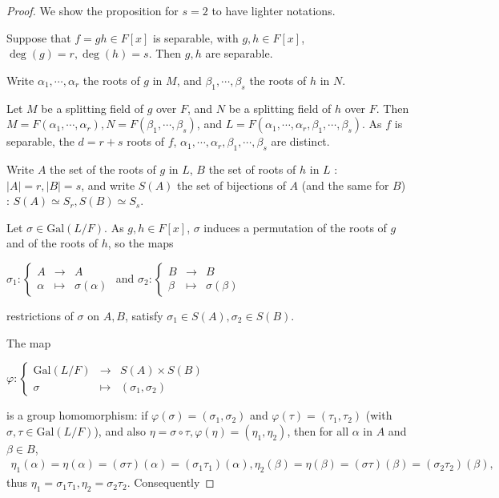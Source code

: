 \documentclass[11pt,a4paper]{article}
\newcommand{\Gal}{\mathrm{Gal}}
\begin{document}
\begin{proof}
We show the proposition for $s=2$ to have lighter notations.

Suppose that $f = gh\in F[x]$ is separable, with $g,h \in F[x]$, $\deg(g)=r,\deg(h)=s$. Then $g,h$ are separable.

 Write $\alpha_1,\cdots,\alpha_{r}$ the roots of $g$ in $M$, and $\beta_1,\cdots,\beta_{s}$ the roots of $h$ in $N$. 

Let $M$ be a splitting field of $g$ over $F$, and $N$ be a splitting field of $h$ over $F$.
Then $M=F(\alpha_1,\cdots,\alpha_r), N = F(\beta_1,\cdots,\beta_{s})$, and  $L=F(\alpha_1,\cdots,\alpha_{r}, \beta_1,\cdots,\beta_{s})$. As $f$ is separable, the $d=r+s$ roots of $f$, $\alpha_1, \cdots,\alpha_{r},\beta_1,\cdots,\beta_{s}$ are distinct.

Write $A$ the set of the roots of $g$ in $L$, $B$ the set of roots of $h$ in $L$ : $\vert A \vert = r, \vert B \vert = s$, and write $S(A)$ the set of bijections of $A$ (and the same for $B$) : $S(A)\simeq S_r, S(B) \simeq S_s$.

Let $\sigma \in \Gal(L/F)$. As $g,h \in F[x]$, $\sigma$ induces a permutation of the roots of $g$ and of the roots of $h$, so the maps
\begin{center}
$\sigma_1 : 
\left\{
\begin{array}{ccc}
A  &\to   &  A \\
  \alpha&  \mapsto  &   \sigma(\alpha) 
\end{array}
\right.
$ and
$\sigma_2 : 
\left\{
\begin{array}{ccc}
B  &\to   &  B \\
  \beta&  \mapsto  &   \sigma(\beta) 
\end{array}
\right.
$
\end{center}
restrictions  of $\sigma$ on $A,B$, satisfy $\sigma_1 \in S(A), \sigma_2 \in S(B)$.

The map
\begin{center}
$\varphi : 
\left\{
\begin{array}{ccc}
\Gal(L/F) &\to   &  S(A)\times S(B) \\
  \sigma&  \mapsto  &  (\sigma_1,\sigma_2)
\end{array}
\right.
$
\end{center}
is a group homomorphism: if $\varphi(\sigma) = (\sigma_1,\sigma_2)$ and $\varphi(\tau) = (\tau_1,\tau_2)$ (with $\sigma,\tau \in \Gal(L/F)$), and also $\eta = \sigma \circ \tau, \varphi(\eta) = (\eta_1,\eta_2)$, then for all $\alpha$ in $A$ and $\beta \in B$, 
\begin{align*}
\eta_1(\alpha) = \eta(\alpha) = (\sigma  \tau)(\alpha) = (\sigma_1  \tau_1)(\alpha) , \eta_2(\beta) = \eta(\beta) = (\sigma  \tau)(\beta) =(\sigma_2  \tau_2)(\beta),
\end{align*}
thus $\eta_1 = \sigma_1\tau_1, \eta_2 = \sigma_2\tau_2$. Consequently 


\end{proof}
\end{document}
